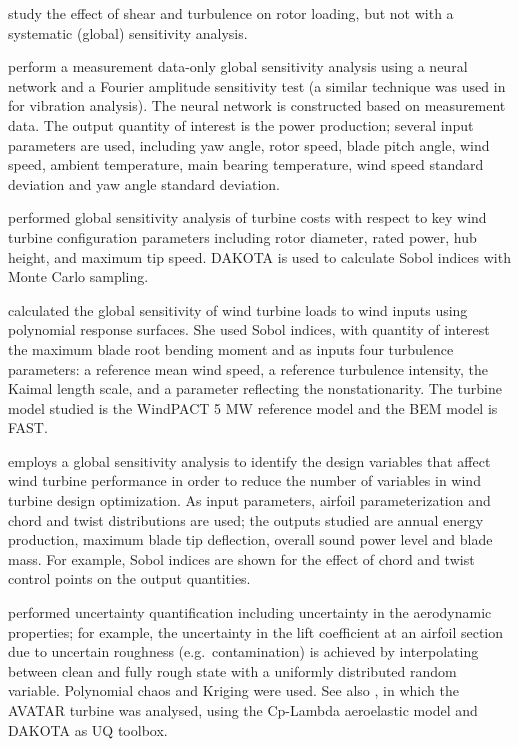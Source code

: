 \documentclass[review]{elsarticle}
\numberwithin{equation}{section}
\numberwithin{equation}{section}
\begin{document}
\cite{Eggers2003} study the effect of shear and turbulence on rotor loading, but not with a systematic (global) sensitivity analysis.

\cite{McKay2014} perform a measurement data-only global sensitivity analysis using a neural network and a Fourier amplitude sensitivity test (a similar technique was used in \cite{Kusiak2010} for vibration analysis). The neural network is constructed based on measurement data. The output quantity of interest is the power production; several input parameters are used, including yaw angle, rotor speed, blade pitch angle, wind speed, ambient temperature, main bearing temperature, wind speed standard deviation and yaw angle standard deviation.

\cite{Dykes2014} performed global sensitivity analysis of turbine costs with respect to key wind turbine configuration parameters including rotor diameter, rated power, hub height, and maximum tip speed. DAKOTA is used to calculate Sobol indices with Monte Carlo sampling.

\cite{Rinker2016a} calculated the global sensitivity of wind turbine loads to wind inputs using polynomial response surfaces. She used Sobol indices, with quantity of interest the maximum blade root bending moment and as inputs four turbulence parameters: a reference mean wind speed, a reference turbulence intensity, the Kaimal length scale, and a parameter reflecting the nonstationarity. The turbine model studied is the WindPACT 5 MW reference model and the BEM model is FAST.

\cite{Echeverria2017} employs a global sensitivity analysis to identify the design variables that affect wind turbine performance in order to reduce the number of variables in wind turbine design optimization. As input parameters, airfoil parameterization and chord and twist distributions are used; the outputs studied are annual energy production, maximum blade tip deflection, overall sound power level and blade mass. For example, Sobol indices are shown for the effect of chord and twist control points on the output quantities.

\cite{Matthaus2017} performed uncertainty quantification including uncertainty in the aerodynamic properties; for example, the uncertainty in the lift coefficient at an airfoil section due to uncertain roughness (e.g.\ contamination) is achieved by interpolating between clean and fully rough state with a uniformly distributed random variable. Polynomial chaos and Kriging were used. See also \cite{Bortolotti2019}, in which the AVATAR turbine was analysed, using the Cp-Lambda aeroelastic model and DAKOTA as UQ toolbox. 
\end{document}
